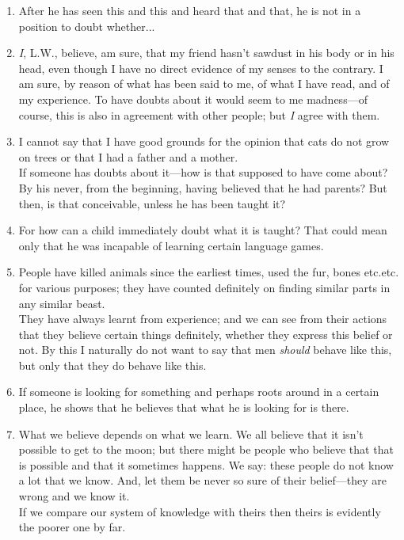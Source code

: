\documentclass{book}
\begin{document}
\begin{enumerate}
\item
After he has seen this and this and heard that and that, he is not in a
position to doubt whether...

\item
\emph{I}, L.W., believe, am sure, that my friend hasn't sawdust in his body or
in his head, even though I have no direct evidence of my senses to the
contrary. I am sure, by reason of what has been said to me, of what I have
read, and of my experience. To have doubts about it would seem to me
madness---of course, this is also in agreement with other people; but \emph{I}
agree with them.

\item
I cannot say that I have good grounds for the opinion that cats do not grow on
trees or that I had a father and a mother. \\
If someone has doubts about it---how is that supposed to have come about? By
his never, from the beginning, having believed that he had parents? But then,
is that conceivable, unless he has been taught it?

\item
For how can a child immediately doubt what it is taught? That could mean only
that he was incapable of learning certain language games.

\item
People have killed animals since the earliest times, used the fur, bones
etc.etc. for various purposes; they have counted definitely on finding similar
parts in any similar beast. \\
They have always learnt from experience; and we can see from their actions that
they believe certain things definitely, whether they express this belief or
not. By this I naturally do not want to say that men \emph{should} behave like
this, but only that they do behave like this.

\item
If someone is looking for something and perhaps roots around in a certain
place, he shows that he believes that what he is looking for is there.

\item
What we believe depends on what we learn. We all believe that it isn't possible
to get to the moon; but there might be people who believe that that is possible
and that it sometimes happens. We say: these people do not know a lot that we
know. And, let them be never so sure of their belief---they are wrong and we
know it. \\
If we compare our system of knowledge with theirs then theirs is evidently the
poorer one by far.


\end{enumerate}
\end{document}
